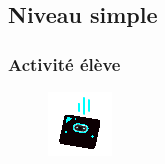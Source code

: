 %
%
\newpage
\subsection{Niveau simple}
\subsubsection{Activité élève}



\begin{figure}
    \includegraphics[width=\linewidth]{res/mbChutes.png}
\end{figure}
